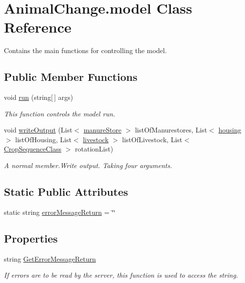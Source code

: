 \hypertarget{class_animal_change_1_1model}{}\section{Animal\+Change.\+model Class Reference}
\label{class_animal_change_1_1model}


Contains the main functions for controlling the model.  


\subsection*{Public Member Functions}
\begin{DoxyCompactItemize}
\item 
void \mbox{\hyperlink{class_animal_change_1_1model_adc89d4cffd48c182ee6496328e888727}{run}} (string\mbox{[}$\,$\mbox{]} args)
\begin{DoxyCompactList}\small\item\em This function controls the model run. \end{DoxyCompactList}\item 
void \mbox{\hyperlink{class_animal_change_1_1model_a8e454fd8dcd665b2e2531b499729dcae}{write\+Output}} (List$<$ \mbox{\hyperlink{classmanure_store}{manure\+Store}} $>$ list\+Of\+Manurestores, List$<$ \mbox{\hyperlink{classhousing}{housing}} $>$ list\+Of\+Housing, List$<$ \mbox{\hyperlink{classlivestock}{livestock}} $>$ list\+Of\+Livestock, List$<$ \mbox{\hyperlink{class_crop_sequence_class}{Crop\+Sequence\+Class}} $>$ rotation\+List)
\begin{DoxyCompactList}\small\item\em A normal member.\+Write output. Taking four arguments. \end{DoxyCompactList}\end{DoxyCompactItemize}
\subsection*{Static Public Attributes}
\begin{DoxyCompactItemize}
\item 
static string \mbox{\hyperlink{class_animal_change_1_1model_a00134912be0bf6244574ee6d006c5afa}{error\+Message\+Return}} = \char`\"{}\char`\"{}
\end{DoxyCompactItemize}
\subsection*{Properties}
\begin{DoxyCompactItemize}
\item 
string \mbox{\hyperlink{class_animal_change_1_1model_a987a46cb1a575a4d2c3cd2710dd1af39}{Get\+Error\+Message\+Return}}
\begin{DoxyCompactList}\small\item\em If errors are to be read by the server, this function is used to access the string. \end{DoxyCompactList}\end{DoxyCompactItemize}


